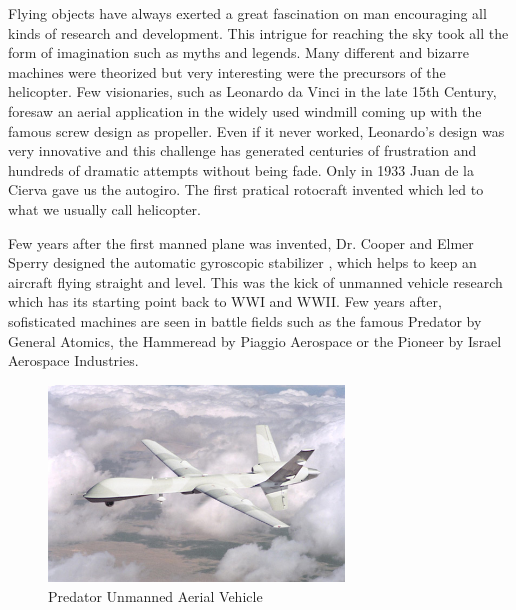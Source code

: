 Flying objects have always exerted a great fascination on man encouraging all kinds of research and development. This intrigue for reaching the sky took all the form of imagination such as myths and legends. Many different and bizarre machines were theorized but very interesting were the precursors of the helicopter. Few visionaries, such as Leonardo da Vinci in the late 15th Century, foresaw an aerial application in the widely used windmill \cite{Heli} coming up with the famous screw design as propeller. Even if it never worked, Leonardo's design was very innovative and this challenge has generated centuries of frustration and hundreds of dramatic attempts without being fade. Only in 1933 Juan de la Cierva gave us the autogiro. The first pratical rotocraft invented which led to what we usually call helicopter. \par Few years after the first manned plane was invented, Dr. Cooper and Elmer Sperry designed the automatic gyroscopic stabilizer \cite{gyro}, which helps to keep an aircraft flying straight and level. This was the kick of unmanned vehicle research which has its starting point back to WWI and WWII. Few years after, sofisticated machines are seen in battle fields such as the famous Predator by General Atomics, the Hammeread by Piaggio Aerospace or the Pioneer by Israel Aerospace Industries. 
\begin{figure}[h]
\centering
 \includegraphics[width=0.7\textwidth]{predator.jpg}
 \caption[Predator UAV]{Predator Unmanned Aerial Vehicle }
 \label{figure:predator}
\end{figure}

